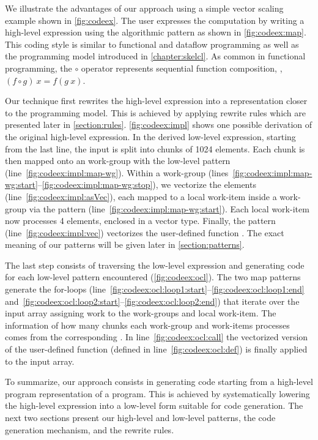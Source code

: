 We illustrate the advantages of our approach using a simple vector scaling example shown in \autoref{fig:codeex}.
The user expresses the computation by writing a high-level expression using the algorithmic  pattern as shown in \autoref{fig:codeex:map}.
This coding style is similar to functional and dataflow programming as well as the \SkelCL programming model introduced in \autoref{chapter:skelcl}.
As common in functional programming, the $\circ$ operator represents sequential function composition, \ie, $(f \circ g)\ x = f(g\ x)$.

Our technique first rewrites the high-level expression into a representation closer to the \OpenCL programming model.
This is achieved by applying rewrite rules which are presented later in \autoref{section:rules}.
\autoref{fig:codeex:impl} shows one possible derivation of the original high-level expression.
In the derived low-level expression, starting from the last line, the input is split into chunks of 1024 elements.
Each chunk is then mapped onto an \OpenCL work-group with the  low-level pattern (line~\ref{fig:codeex:impl:map-wg}).
Within a work-group (lines~\ref{fig:codeex:impl:map-wg:start}--\ref{fig:codeex:impl:map-wg:stop}), we vectorize the elements (line~\ref{fig:codeex:impl:asVec}), each mapped to a local work-item inside a work-group via the  pattern (line~\ref{fig:codeex:impl:map-wg:start}).
Each local work-item now processes 4 elements, enclosed in a vector type.
Finally, the  pattern (line~\ref{fig:codeex:impl:vec}) vectorizes the user-defined function .
The exact meaning of our patterns will be given later in \autoref{section:patterns}.

The last step consists of traversing the low-level expression and generating \OpenCL code for each low-level pattern encountered (\autoref{fig:codeex:ocl}).
The two map patterns generate the for-loops (line~\ref{fig:codeex:ocl:loop1:start}--\ref{fig:codeex:ocl:loop1:end} and~\ref{fig:codeex:ocl:loop2:start}--\ref{fig:codeex:ocl:loop2:end}) that iterate over the input array assigning work to the work-groups and local work-item.
The information of how many chunks each work-group and work-items processes comes from the corresponding .
In line~\ref{fig:codeex:ocl:call} the vectorized version of the user-defined  function (defined in line~\ref{fig:codeex:ocl:def}) is finally applied to the input array.

To summarize, our approach consists in generating \OpenCL code starting from a high-level program representation of a program.
This is achieved by systematically lowering the high-level expression into a low-level form suitable for code generation.
The next two sections present our high-level and low-level patterns, the code generation mechanism, and the rewrite rules.

